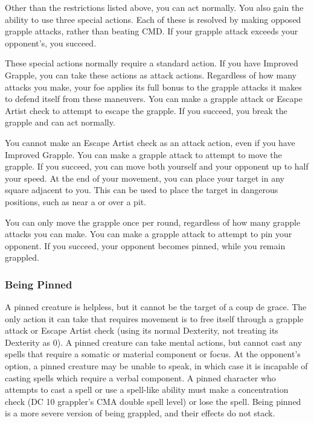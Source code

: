 Other than the restrictions listed above, you can act normally. You also gain the ability to use three special actions. Each of these is resolved by making opposed grapple attacks, rather than beating CMD. If your grapple attack exceeds your opponent's, you succeed.
\par These special actions normally require a standard action. If you have Improved Grapple, you can take these actions as attack actions. Regardless of how many attacks you make, your foe applies its full bonus to the grapple attacks it makes to defend itself from these maneuvers.
 You can make a grapple attack or Escape Artist check to attempt to escape the grapple. If you succeed, you break the grapple and can act normally.
\par You cannot make an Escape Artist check as an attack action, even if you have Improved Grapple.
 You can make a grapple attack to attempt to move the grapple. If you succeed, you can move both yourself and your opponent up to half your speed. At the end of your movement, you can place your target in any square adjacent to you. This can be used to place the target in dangerous positions, such as near a  or over a pit.
\par You can only move the grapple once per round, regardless of how many grapple attacks you can make.
 You can make a grapple attack to attempt to pin your opponent. If you succeed, your opponent becomes pinned, while you remain grappled.

\subsubsection{Being Pinned}
A pinned creature is helpless, but it cannot be the target of a coup de grace. The only action it can take that requires movement is to free itself through a grapple attack or Escape Artist check (using its normal Dexterity, not treating its Dexterity as 0). A pinned creature can take mental actions, but cannot cast any spells that require a somatic or material component or focus. At the opponent's option, a pinned creature may be unable to speak, in which case it is incapable of casting spells which require a verbal component. A pinned character who attempts to cast a spell or use a spell-like ability must make a concentration check (DC 10 \add grappler's CMA \add double spell level) or lose the spell. Being pinned is a more severe version of being grappled, and their effects do not stack.

